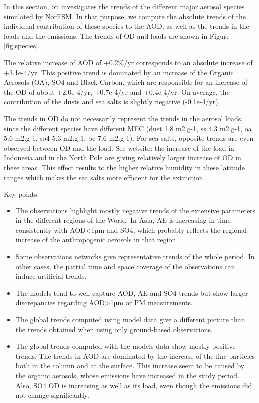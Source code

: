 \documentclass[journal abbreviation, manuscript]{copernicus}
\begin{document}
In this section, on investigates the trends of the different major aerosol species simulated by NorESM. In that purpose, we compute the absolute trends of the individual contribution of these species to the AOD, as well as the trends in the loads and the emissions. The trends of OD and loads are shown in Figure \ref{fig:species}.

The relative increase of AOD of +0.2\%/yr corresponds to an absolute increase of +3.1e-4/yr. This positive trend is dominated by an increase of the Organic Aerosols (OA), SO4 and Black Carbon, which are responsible for an increase of the OD of about +2.0e-4/yr, +0.7e-4/yr and +0.4e-4/yr. On average, the contribution of the dusts and sea salts is slightly negative (-0.1e-4/yr).

The trends in OD do not necessarily represent the trends in the aerosol loads, since the different species have different MEC (dust 1.8 m2.g-1, ss 4.3 m2.g-1, oa 5.6 m2.g-1, so4 5.3 m2.g-1, bc 7.6 m2.g-1). For sea salts, opposite trends are even observed between OD and the load. See website: the increase of the load in Indonesia and in the North Pole are giving relatively larger increase of OD in these areas. This effect results to the higher relative humidity in these latitude ranges which makes the sea salts more efficient for the extinction.


\conclusions  %

Key points:
\begin{itemize}
    \item The observations highlight mostly negative trends of the extensive parameters in the different regions of the World. In Asia, AE is increasing in time consistently with AOD<1µm and SO4, which probably reflects the regional increase of the anthropogenic aerosols in that region.
    \item Some observations networks give representative trends of the whole period. In other cases, the partial time and space coverage of the observations can induce artificial trends.
    \item The models tend to well capture AOD, AE and SO4 trends but show larger discrepancies regarding AOD>1μm or PM measurements.
    \item The global trends computed using model data give a different picture than the trends obtained when using only ground-based observations.
    \item The global trends computed with the models data show mostly positive trends. The trends in AOD are dominated by the increase of the fine particles both in the column and at the surface. This increase seem to be caused by the organic aerosols, whose emissions have increased in the study period. Also, SO4 OD is increasing as well as its load, even though the emissions did not change significantly.
\end{itemize}
\end{document}
